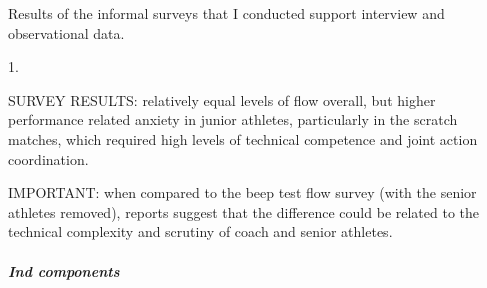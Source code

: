 \begin{CJK}{UTF8}{gbsn}

Results of the informal surveys that I conducted support interview and observational data.

1.


SURVEY RESULTS: relatively equal levels of flow overall, but higher performance related anxiety in junior athletes, particularly in the scratch matches, which required high levels of technical competence and joint action coordination.




IMPORTANT: when compared to the beep test flow survey (with the senior athletes removed), reports suggest that the difference could be related to the technical complexity and scrutiny of coach and senior athletes.













          \subparagraph{Ind components}




\end{CJK}
